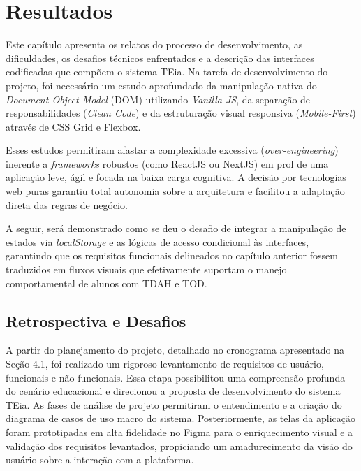 \chapter{Resultados}
\label{chap:Resultados E Interfaces Do Sistema}

Este capítulo apresenta os relatos do processo de desenvolvimento, as dificuldades, os desafios técnicos enfrentados e a descrição das interfaces codificadas que compõem o sistema TEia. Na tarefa de desenvolvimento do projeto, foi necessário um estudo aprofundado da manipulação nativa do \textit{Document Object Model} (DOM) utilizando \textit{Vanilla JS}, da separação de responsabilidades (\textit{Clean Code}) e da estruturação visual responsiva (\textit{Mobile-First}) através de CSS Grid e Flexbox.

Esses estudos permitiram afastar a complexidade excessiva (\textit{over-engineering}) inerente a \textit{frameworks} robustos (como ReactJS ou NextJS) em prol de uma aplicação leve, ágil e focada na baixa carga cognitiva. A decisão por tecnologias web puras garantiu total autonomia sobre a arquitetura e facilitou a adaptação direta das regras de negócio.

A seguir, será demonstrado como se deu o desafio de integrar a manipulação de estados via \textit{localStorage} e as lógicas de acesso condicional às interfaces, garantindo que os requisitos funcionais delineados no capítulo anterior fossem traduzidos em fluxos visuais que efetivamente suportam o manejo comportamental de alunos com TDAH e TOD.

\vspace{0.5cm}
\section{Retrospectiva e Desafios}

A partir do planejamento do projeto, detalhado no cronograma apresentado na Seção 4.1, foi realizado um rigoroso levantamento de requisitos de usuário, funcionais e não funcionais. Essa etapa possibilitou uma compreensão profunda do cenário educacional e direcionou a proposta de desenvolvimento do sistema TEia. As fases de análise de projeto permitiram o entendimento e a criação do diagrama de casos de uso macro do sistema. Posteriormente, as telas da aplicação foram prototipadas em alta fidelidade no Figma para o enriquecimento visual e a validação dos requisitos levantados, propiciando um amadurecimento da visão do usuário sobre a interação com a plataforma.

